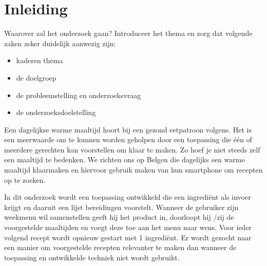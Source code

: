 \documentclass{hogent-article}
\begin{document}



\section{Inleiding}%
\label{sec:inleiding}


Waarover zal het onderzoek gaan? Introduceer het thema en zorg dat volgende zaken zeker duidelijk aanwezig zijn:

\begin{itemize}
  \item kaderen thema
  \item de doelgroep
  \item de probleemstelling en onderzoeksvraag
  \item de onderzoeksdoelstelling
\end{itemize}

Een dagelijkse warme maaltijd hoort bij een gezond eetpatroon volgens\cite{Galle2016}. Het is een meerwaarde om te kunnen worden geholpen door een toepassing die één of meerdere gerechten kan voorstellen om klaar te maken. Zo hoef je niet steeds zelf een maaltijd te bedenken. We richten ons op Belgen die dagelijks een warme maaltijd klaarmaken en hiervoor gebruik maken van hun smartphone om recepten op te zoeken. 

In dit onderzoek wordt een toepassing ontwikkeld die een ingrediënt als invoer krijgt en daaruit een lijst bereidingen voorstelt. Wanneer de gebruiker zijn weekmenu wil samenstellen geeft hij het product in, doorloopt hij /zij de voorgestelde maaltijden en voegt deze toe aan het menu naar wens. Voor ieder volgend recept wordt opnieuw gestart met 1 ingrediënt. Er wordt gezocht naar een manier om voorgestelde recepten relevanter te maken dan wanneer de toepassing en ontwikkelde techniek niet wordt gebruikt.
\end{document}
